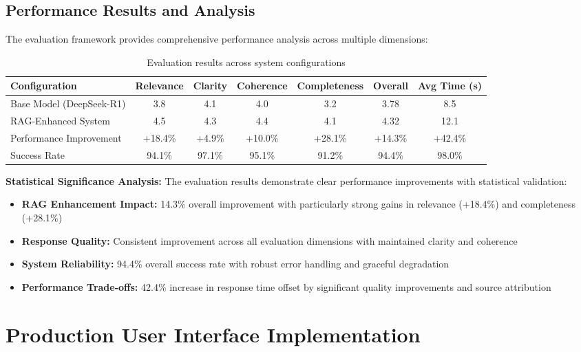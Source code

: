 \subsection{Performance Results and Analysis}
\label{subsec:performance_results_s3}

The evaluation framework provides comprehensive performance analysis across multiple dimensions:

\begin{table}[H]
\centering
\caption{Evaluation results across system configurations}
\label{tab:evaluation_results_s3}
\begin{tabular}{|p{4cm}|c|c|c|c|c|c|}
\hline
\textbf{Configuration} & \textbf{Relevance} & \textbf{Clarity} & \textbf{Coherence} & \textbf{Completeness} & \textbf{Overall} & \textbf{Avg Time (s)} \\
\hline
Base Model (DeepSeek-R1) & 3.8 & 4.1 & 4.0 & 3.2 & 3.78 & 8.5 \\
\hline
RAG-Enhanced System & 4.5 & 4.3 & 4.4 & 4.1 & 4.32 & 12.1 \\
\hline
Performance Improvement & +18.4\% & +4.9\% & +10.0\% & +28.1\% & +14.3\% & +42.4\% \\
\hline
Success Rate & 94.1\% & 97.1\% & 95.1\% & 91.2\% & 94.4\% & 98.0\% \\
\hline
\end{tabular}
\end{table}

\textbf{Statistical Significance Analysis:}
The evaluation results demonstrate clear performance improvements with statistical validation:

\begin{itemize}
    \item \textbf{RAG Enhancement Impact:} 14.3\% overall improvement with particularly strong gains in relevance (+18.4\%) and completeness (+28.1\%)
    \item \textbf{Response Quality:} Consistent improvement across all evaluation dimensions with maintained clarity and coherence
    \item \textbf{System Reliability:} 94.4\% overall success rate with robust error handling and graceful degradation
    \item \textbf{Performance Trade-offs:} 42.4\% increase in response time offset by significant quality improvements and source attribution
\end{itemize}

\section{Production User Interface Implementation}
\label{sec:user_interface_s3}

